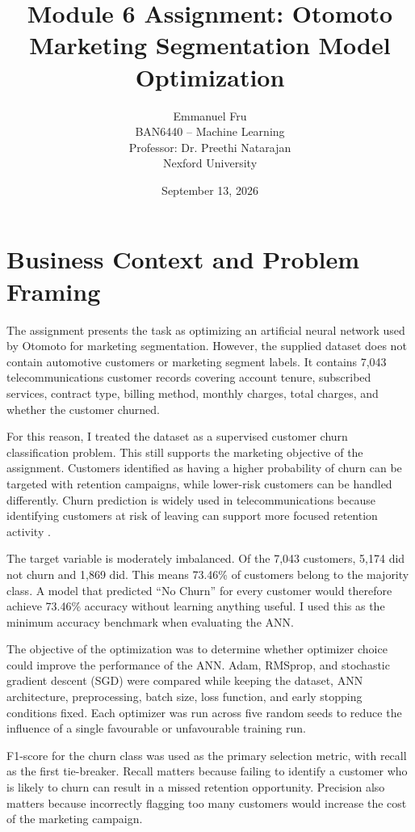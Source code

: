 \documentclass[11pt]{article}
\title{\textbf{Module 6 Assignment: Otomoto Marketing Segmentation Model Optimization}}
\author{
Emmanuel Fru\\
BAN6440 -- Machine Learning\\
Professor: Dr. Preethi Natarajan\\
Nexford University
}
\date{September 13, 2026}
\begin{document}
\maketitle

\section{Business Context and Problem Framing}

The assignment presents the task as optimizing an artificial neural network used by Otomoto for marketing segmentation. However, the supplied dataset does not contain automotive customers or marketing segment labels. It contains 7,043 telecommunications customer records covering account tenure, subscribed services, contract type, billing method, monthly charges, total charges, and whether the customer churned.

For this reason, I treated the dataset as a supervised customer churn classification problem. This still supports the marketing objective of the assignment. Customers identified as having a higher probability of churn can be targeted with retention campaigns, while lower-risk customers can be handled differently. Churn prediction is widely used in telecommunications because identifying customers at risk of leaving can support more focused retention activity \citep{vafeiadis2015,ahmad2019,amin2019}.

The target variable is moderately imbalanced. Of the 7,043 customers, 5,174 did not churn and 1,869 did. This means 73.46\% of customers belong to the majority class. A model that predicted ``No Churn'' for every customer would therefore achieve 73.46\% accuracy without learning anything useful. I used this as the minimum accuracy benchmark when evaluating the ANN.

The objective of the optimization was to determine whether optimizer choice could improve the performance of the ANN. Adam, RMSprop, and stochastic gradient descent (SGD) were compared while keeping the dataset, ANN architecture, preprocessing, batch size, loss function, and early stopping conditions fixed. Each optimizer was run across five random seeds to reduce the influence of a single favourable or unfavourable training run.

F1-score for the churn class was used as the primary selection metric, with recall as the first tie-breaker. Recall matters because failing to identify a customer who is likely to churn can result in a missed retention opportunity. Precision also matters because incorrectly flagging too many customers would increase the cost of the marketing campaign.
\end{document}
